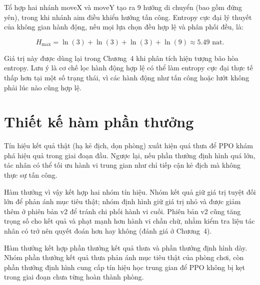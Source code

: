 Tổ hợp hai nhánh moveX và moveY tạo ra 9 hướng di chuyển (bao gồm đứng yên), trong khi nhánh aim điều khiển hướng tấn công. Entropy cực đại lý thuyết của không gian hành động, nếu mọi lựa chọn đều hợp lệ và phân phối đều, là:

\begin{equation}
    H_{\max} = \ln(3) + \ln(3) + \ln(3) + \ln(9) \approx 5.49 \text{ nat}.
    \label{eq:max_entropy}
\end{equation}

Giá trị này được dùng lại trong Chương~4 khi phân tích hiện tượng bão hòa entropy. Lưu ý là cơ chế lọc hành động hợp lệ có thể làm entropy cực đại thực tế thấp hơn tại một số trạng thái, vì các hành động như tấn công hoặc lướt không phải lúc nào cũng hợp lệ.

\section{Thiết kế hàm phần thưởng}

Tín hiệu kết quả thật (hạ kẻ địch, dọn phòng) xuất hiện quá thưa để PPO khám phá hiệu quả trong giai đoạn đầu. Ngược lại, nếu phần thưởng định hình quá lớn, tác nhân có thể tối ưu hành vi trung gian như chỉ tiếp cận kẻ địch mà không thực sự tấn công.

Hàm thưởng vì vậy kết hợp hai nhóm tín hiệu. Nhóm kết quả giữ giá trị tuyệt đối lớn để phản ánh mục tiêu thật; nhóm định hình giữ giá trị nhỏ và được giảm thêm ở phiên bản v2 để tránh chi phối hành vi cuối. Phiên bản v2 cũng tăng trọng số cho kết quả và phạt mạnh hơn hành vi chần chừ, nhằm kiểm tra liệu tác nhân có trở nên quyết đoán hơn hay không (đánh giá ở Chương~4).

Hàm thưởng kết hợp phần thưởng kết quả thưa và phần thưởng định hình dày. Nhóm phần thưởng kết quả thưa phản ánh mục tiêu thật của phòng chơi, còn phần thưởng định hình cung cấp tín hiệu học trung gian để PPO không bị kẹt trong giai đoạn chưa từng hoàn thành phòng.

